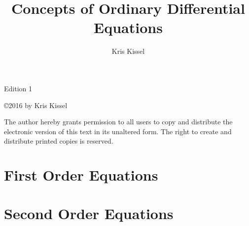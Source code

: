 \documentclass[11pt,letterpaper,twoside]{amsbook}
\title{Concepts of Ordinary Differential Equations}
\author{Kris Kissel}
\begin{document}
\frontmatter
\maketitle

\vfill
\begin{center}
Edition 1

\smallskip
\copyright 2016 by Kris Kissel

\smallskip
The author hereby grants permission to all users to copy and distribute the electronic version of this text in its unaltered form.  The right to create and distribute printed copies is reserved.
\end{center}

\tableofcontents







\mainmatter





\part{First Order Equations}









\part{Second Order Equations}

\end{document}
